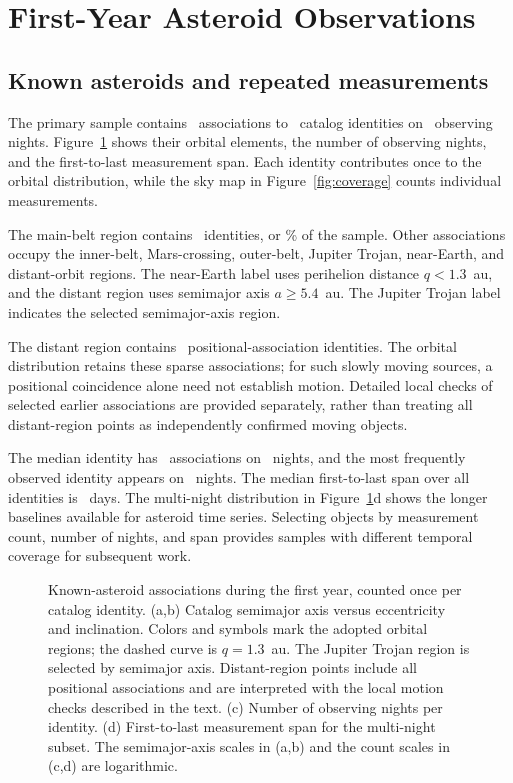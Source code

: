 \section{First-Year Asteroid Observations}
\label{sec:samples}

\subsection{Known asteroids and repeated measurements}
\label{sec:known_population}

The primary sample contains \yrNAssoc\ associations to
\yrNKnown\ catalog identities on \yrNKnownNights\ observing
nights. Figure~\ref{fig:orbits} shows their orbital elements,
the number of observing nights, and the first-to-last measurement
span. Each identity contributes once to the orbital distribution,
while the sky map in Figure~\ref{fig:coverage} counts individual
measurements.

The main-belt region contains \yrNMainBelt\ identities,
or \yrMainBeltFrac\% of the sample. Other associations occupy
the inner-belt, Mars-crossing, outer-belt, Jupiter Trojan,
near-Earth, and distant-orbit regions. The near-Earth label
uses perihelion distance $q<1.3$~au, and the distant region
uses semimajor axis $a\geq5.4$~au. The Jupiter Trojan label
indicates the selected semimajor-axis region.

The distant region contains \yrNDistant\ positional-association
identities. The orbital distribution retains these sparse associations;
for such slowly moving sources, a positional coincidence alone need not
establish motion. Detailed local checks of selected earlier associations
are provided separately, rather than treating all distant-region points
as independently confirmed moving objects.

The median identity has \yrMedAssoc\ associations on
\yrMedNights\ nights, and the most frequently observed identity
appears on \yrMaxNights\ nights. The median first-to-last span
over all identities is \yrMedBaseline~days. The multi-night
distribution in Figure~\ref{fig:orbits}d shows the longer
baselines available for asteroid time series. Selecting objects
by measurement count, number of nights, and span provides samples
with different temporal coverage for subsequent work.

\begin{figure}[tbp]
\centering
{}
\caption{Known-asteroid associations during the first year, counted
once per catalog identity. (a,b) Catalog semimajor axis versus
eccentricity and inclination. Colors and symbols mark the adopted
orbital regions; the dashed curve is $q=1.3$~au. The Jupiter Trojan
region is selected by semimajor axis. Distant-region points include
all positional associations and are interpreted with the local
motion checks described in the text. (c) Number of observing
nights per identity. (d) First-to-last measurement span for the
multi-night subset. The semimajor-axis scales in (a,b) and the
count scales in (c,d) are logarithmic.}
\label{fig:orbits}
\end{figure}

